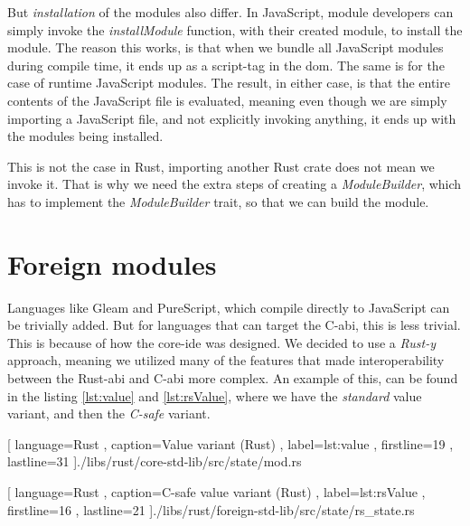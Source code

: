 But \textit{installation} of the modules also differ. In JavaScript, module
developers can simply invoke the \textit{installModule} function, with their
created module, to install the module. The reason this works, is that when we
bundle all JavaScript modules during compile time, it ends up as a script-tag in
the \gls*{dom}. The same is for the case of runtime JavaScript modules. The
result, in either case, is that the entire contents of the JavaScript file is
evaluated, meaning even though we are simply importing a JavaScript file, and
not explicitly invoking anything, it ends up with the modules being installed.

This is not the case in Rust, importing another Rust crate does not mean we
invoke it. That is why we need the extra steps of creating a
\textit{ModuleBuilder}, which has to implement the \textit{ModuleBuilder} trait,
so that we can build the module.


\section{Foreign modules} \label{sec:fm}

Languages like Gleam and PureScript, which compile directly to JavaScript can
be trivially added. But for languages that can target the C-\gls*{abi}, this is
less trivial. This is because of how the core-\gls*{ide} was designed. We decided
to use a \textit{Rust-y} approach, meaning we utilized many of the features that
made interoperability between the Rust-\gls*{abi} and C-\gls*{abi} more complex.
An example of this, can be found in the listing \ref{lst:value} and
\ref{lst:rsValue}, where we have the \textit{standard} value variant, and then
the \textit{C-safe} variant.

\begin{code}[H]
  
    [ language=Rust
    , caption={Value variant (Rust)}
    , label=lst:value
    , firstline=19
    , lastline=31
    ]{./libs/rust/core-std-lib/src/state/mod.rs}
\end{code}

\begin{code}[H]
  
    [ language=Rust
    , caption={C-safe value variant (Rust)}
    , label=lst:rsValue
    , firstline=16
    , lastline=21
    ]{./libs/rust/foreign-std-lib/src/state/rs\_state.rs}
\end{code}

